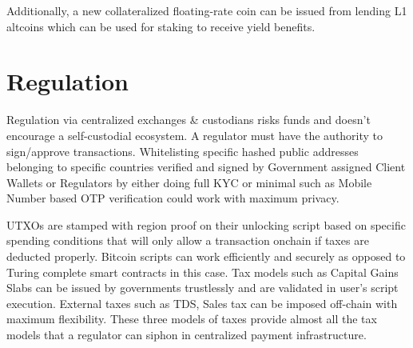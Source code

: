 \documentclass[a4paper,10pt]{article}
\begin{document}
Additionally, a new collateralized floating-rate coin can be issued from lending L1 altcoins which can be used for staking to receive yield benefits. 
\section{Regulation}
Regulation via centralized exchanges \& custodians risks funds and doesn't encourage a self-custodial ecosystem. A regulator must have the authority to sign/approve transactions. Whitelisting specific hashed public addresses belonging to specific countries verified and signed by Government assigned Client Wallets or Regulators by either doing full KYC or minimal such as Mobile Number based OTP verification could work with maximum privacy.

 UTXOs are stamped with region proof on their unlocking script based on specific spending conditions that will only allow a transaction onchain if taxes are deducted properly. Bitcoin scripts can work efficiently and securely as opposed to Turing complete smart contracts in this case. Tax models such as Capital Gains Slabs can be issued by governments trustlessly and are validated in user's script execution. External taxes such as TDS, Sales tax can be imposed off-chain with maximum flexibility. These three models of taxes provide almost all the tax models that a regulator can siphon in centralized payment infrastructure.
\end{document}
